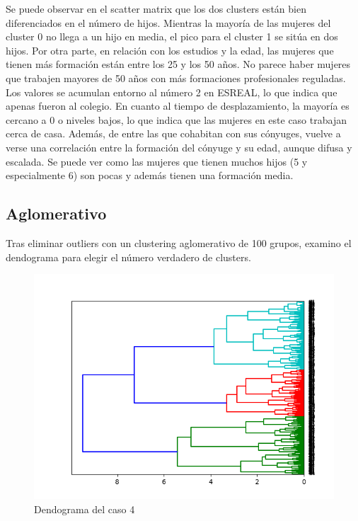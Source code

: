 Se puede observar en el scatter matrix que los dos clusters están bien diferenciados en el número de hijos. Mientras la mayoría de las mujeres del cluster 0 no llega a un hijo en media, el pico para el cluster 1 se sitúa en dos hijos. Por otra parte, en relación con los estudios y la edad, las mujeres que tienen más formación están entre los 25 y los 50 años. No parece haber mujeres que trabajen mayores de 50 años con más formaciones profesionales reguladas. Los valores se acumulan entorno al número 2 en ESREAL, lo que indica que apenas fueron al colegio. En cuanto al tiempo de desplazamiento, la mayoría es cercano a 0 o niveles bajos, lo que indica que las mujeres en este caso trabajan cerca de casa. Además, de entre las que cohabitan con sus cónyuges, vuelve a verse una correlación entre la formación del cónyuge y su edad, aunque difusa y escalada. Se puede ver como las mujeres que tienen muchos hijos (5 y especialmente 6) son pocas y además tienen una formación media.

\newpage

\subsection{Aglomerativo}

Tras eliminar outliers con un clustering aglomerativo de 100 grupos, examino el dendograma para elegir el número verdadero de clusters.

\begin{figure}[H] %
	\centering
	\includegraphics[scale=0.65]{dg4.png}  %
	\caption{Dendograma del caso 4}
	\label{fig:dg4}
\end{figure}

